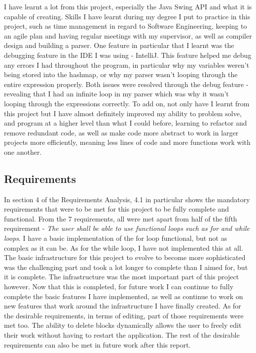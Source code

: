 \documentclass[a4paper, 12pt]{article}
\begin{document}
        I have learnt a lot from this project, especially the Java Swing API and what it is
        capable of creating. Skills I have learnt during my degree I put to practice in this
        project, such as time management in regard to Software Engineering, keeping to an
        agile plan and having regular meetings with my supervisor, as well as compiler design
        and building a parser. One feature in particular that I learnt was the debugging feature
        in the IDE I was using - IntelliJ. This feature helped me debug any errors I had
        throughout the program, in particular why my variables weren't being stored into the
        hashmap, or why my parser wasn't looping through the entire expression properly. Both
        issues were resolved through the debug feature - revealing that I had an infinite loop
        in my parser which was why it wasn't looping through the expressions correctly.
        To add on, not only have I learnt from this project but I have almost definitely
        improved my ability to problem solve, and program at a higher level than what I could before,
        learning to refactor and remove redundant code, as well as make code more abstract to work
        in larger projects more efficiently, meaning less lines of code and more functions work
        with one another. \\ 

    \subsection{Requirements}
        In section 4 of the Requirements Analysis, 4.1 in particular shows the mandatory
        requirements that were to be met for this project to be fully complete and functional.
        From the 7 requirements, all were met apart from half of the fifth requirement -
        \textit{The user shall be able to use functional loops such as for and while loops}.
        I have a basic implementation of the for loop functional, but not as complex as it can
        be. As for the while loop, I have not implemented this at all. The basic infrastructure
        for this project to evolve to become more sophisticated was the challenging part and
        took a lot longer to complete than I aimed for, but it is complete. The infrastructure
        was the most important part of this project however. Now that this is completed, for
        future work I can continue to fully complete the basic features I have implemented,
        as well as continue to work on new features that work around the infrastructure I have
        finally created. As for the desirable requirements, in terms of editing, part of those requirements were
        met too. The ability to delete blocks dynamically allows the user to freely edit their
        work without having to restart the application. The rest of the desirable requirements
        can also be met in future work after this report.
\end{document}
